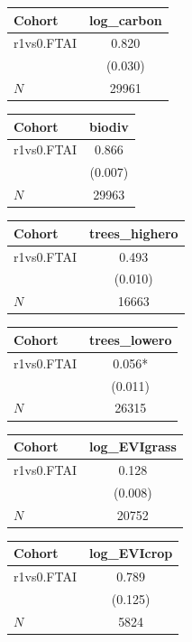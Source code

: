 {
\def\sym#1{\ifmmode^{#1}\else\(^{#1}\)\fi}
\begin{tabular}{l*{1}{c}}
\toprule
Cohort    &log\_carbon   \\
\midrule
r1vs0.FTAI&    0.820   \\
          &  (0.030)   \\
\midrule
\(N\)     &    29961   \\
\bottomrule
\end{tabular}
}
{
\def\sym#1{\ifmmode^{#1}\else\(^{#1}\)\fi}
\begin{tabular}{l*{1}{c}}
\toprule
Cohort    &   biodiv   \\
\midrule
r1vs0.FTAI&    0.866   \\
          &  (0.007)   \\
\midrule
\(N\)     &    29963   \\
\bottomrule
\end{tabular}
}
{
\def\sym#1{\ifmmode^{#1}\else\(^{#1}\)\fi}
\begin{tabular}{l*{1}{c}}
\toprule
Cohort    &trees\_highero   \\
\midrule
r1vs0.FTAI&    0.493   \\
          &  (0.010)   \\
\midrule
\(N\)     &    16663   \\
\bottomrule
\end{tabular}
}
{
\def\sym#1{\ifmmode^{#1}\else\(^{#1}\)\fi}
\begin{tabular}{l*{1}{c}}
\toprule
Cohort    &trees\_lowero   \\
\midrule
r1vs0.FTAI&    0.056*  \\
          &  (0.011)   \\
\midrule
\(N\)     &    26315   \\
\bottomrule
\end{tabular}
}
{
\def\sym#1{\ifmmode^{#1}\else\(^{#1}\)\fi}
\begin{tabular}{l*{1}{c}}
\toprule
Cohort    &log\_EVIgrass   \\
\midrule
r1vs0.FTAI&    0.128   \\
          &  (0.008)   \\
\midrule
\(N\)     &    20752   \\
\bottomrule
\end{tabular}
}
{
\def\sym#1{\ifmmode^{#1}\else\(^{#1}\)\fi}
\begin{tabular}{l*{1}{c}}
\toprule
Cohort    &log\_EVIcrop   \\
\midrule
r1vs0.FTAI&    0.789   \\
          &  (0.125)   \\
\midrule
\(N\)     &     5824   \\
\bottomrule
\end{tabular}
}
